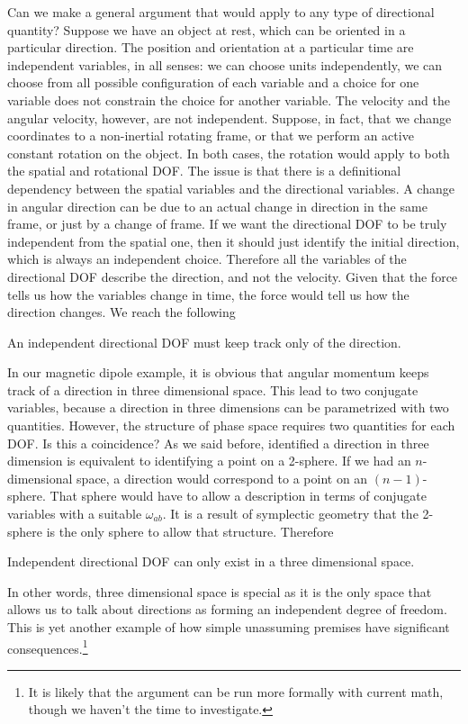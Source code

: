 Can we make a general argument that would apply to any type of directional quantity? Suppose we have an object at rest, which can be oriented in a particular direction. The position and orientation at a particular time are independent variables, in all senses: we can choose units independently, we can choose from all possible configuration of each variable and a choice for one variable does not constrain the choice for another variable. The velocity and the angular velocity, however, are not independent. Suppose, in fact, that we change coordinates to a non-inertial rotating frame, or that we perform an active constant rotation on the object. In both cases, the rotation would apply to both the spatial and rotational DOF. The issue is that there is a definitional dependency between the spatial variables and the directional variables. A change in angular direction can be due to an actual change in direction in the same frame, or just by a change of frame. If we want the directional DOF to be truly independent from the spatial one, then it should just identify the initial direction, which is always an independent choice. Therefore all the variables of the directional DOF describe the direction, and not the velocity. Given that the force tells us how the variables change in time, the force would tell us how the direction changes. We reach the following
\begin{insight}
	An independent directional DOF must keep track only of the direction.
\end{insight}

In our magnetic dipole example, it is obvious that angular momentum keeps track of a direction in three dimensional space. This lead to two conjugate variables, because a direction in three dimensions can be parametrized with two quantities. However, the structure of phase space requires two quantities for each DOF. Is this a coincidence? As we said before, identified a direction in three dimension is equivalent to identifying a point on a 2-sphere. If we had an $n$-dimensional space, a direction would correspond to a point on an $(n-1)$-sphere. That sphere would have to allow a description in terms of conjugate variables with a suitable $\omega_{ab}$. It is a result of symplectic geometry that the 2-sphere is the only sphere to allow that structure. Therefore
\begin{insight}
	Independent directional DOF can only exist in a three dimensional space.
\end{insight}

In other words, three dimensional space is special as it is the only space that allows us to talk about directions as forming an independent degree of freedom. This is yet another example of how simple unassuming premises have significant consequences.\footnote{It is likely that the argument can be run more formally with current math, though we haven't the time to investigate.}

